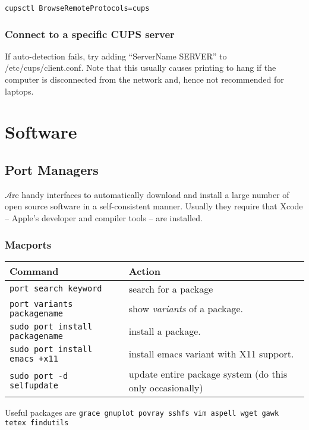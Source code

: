 \documentclass[a4paper,10pt]{article}
\begin{document}
\verb+cupsctl BrowseRemoteProtocols=cups+

\subsubsection{Connect to a specific CUPS server}
If auto-detection fails, try adding ``ServerName SERVER'' to /etc/cups/client.conf. Note that this usually causes printing to hang if the computer is disconnected from the network and, hence not recommended for laptops.


\section{Software}
\subsection{Port Managers}
$\mathcal{A}$re handy interfaces to automatically download and install a large number of open source software in a self-consistent manner. Usually they require that Xcode -- Apple's developer and compiler tools -- are installed.
\subsubsection{Macports}
\begin{table}[h!]
\center
\begin{tabular}{ll}\hline\hline
Command              & Action \\\hline
\verb"port search keyword" & search for a package\\
\verb+port variants packagename+ & show \emph{variants} of a package.\\
\verb"sudo port install packagename" & install a package.\\
\verb"sudo port install emacs +x11" & install emacs variant with X11 support.\\
\verb"sudo port -d selfupdate" & update entire package system (do this only occasionally)\\\hline
\end{tabular}\end{table}
%
Useful packages are \verb+grace gnuplot povray sshfs vim aspell wget gawk tetex findutils+
\end{document}
